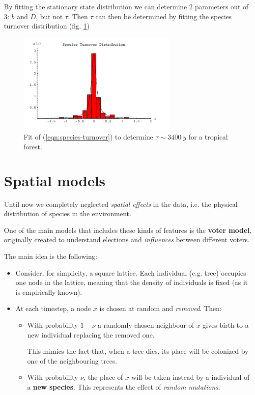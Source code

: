 \documentclass[../../main.tex]{subfiles}
\begin{document}
By fitting the stationary state distribution we can determine $2$ parameters out of $3$: $b$ and $D$, but not $\tau$. Then $\tau$ can then be determined by fitting the species turnover distribution (fig. \ref{fig:speciesturnover})

\begin{figure}[H]
    \centering
    \includegraphics[width=0.7\textwidth]{speciesturnover.png}
    \caption{Fit of (\ref{eqn:species-turnover}) to determine $\tau \sim \SI{3400}{y}$ for a tropical forest.}
    \label{fig:speciesturnover}
\end{figure}

\section{Spatial models}\label{sec:spatial-models}
Until now we completely neglected \textit{spatial effects} in the data, i.e. the physical distribution of species in the environment. 

One of the main models that includes these kinds of features is the \textbf{voter model}, originally created to understand elections and \textit{influences} between different voters.

The main idea is the following:
\begin{itemize}
    \item Consider, for simplicity, a square lattice. Each individual (e.g. tree) occupies one node in the lattice, meaning that the density of individuals is fixed (as it is empirically known).
    \item At each timestep, a node $x$ is chosen at random and \textit{removed}. Then:
    \begin{itemize}
        \item With probability $1-\nu$ a randomly chosen neighbour of $x$ gives birth to a new individual replacing the removed one.
        
        This mimics the fact that, when a tree dies, its place will be colonized by one of the neighbouring trees.  
        \item With probability $\nu$, the place of $x$ will be taken instead by a individual of a \textbf{new species}. This represents the effect of \textit{random mutations}.  
    \end{itemize}
\end{itemize}
\end{document}
